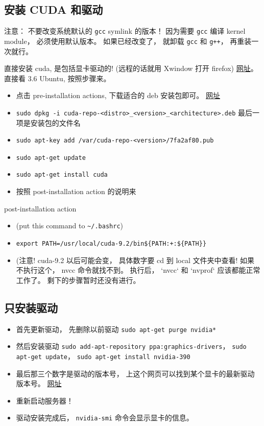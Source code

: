 

\subsection{安装 CUDA 和驱动}
注意： 不要改变系统默认的 \verb|gcc| symlink 的版本！ 因为需要 \verb|gcc| 编译 kernel module， 必须使用默认版本。 如果已经改变了， 就卸载 \verb|gcc| 和 \verb|g++|， 再重装一次就行。

直接安装 cuda, 是包括显卡驱动的! (远程的话就用 Xwindow 打开 firefox)
\href{https://docs.nvidia.com/cuda/cuda-installation-guide-linux/index.html#ubuntu-installation}{网址}。 直接看 3.6 Ubuntu, 按照步骤来。
\begin{itemize}
\item 点击 pre-installation actions, 下载适合的 deb 安装包即可。 \href{https://developer.nvidia.com/cuda-downloads}{网址}
\item \verb`sudo dpkg -i cuda-repo-<distro>_<version>_<architecture>.deb`   最后一项是安装包的文件名
\item \verb`sudo apt-key add /var/cuda-repo-<version>/7fa2af80.pub`
\item \verb`sudo apt-get update`
\item \verb`sudo apt-get install cuda`
\item 按照 post-installation action 的说明来
\end{itemize}

post-installation action
\begin{itemize}
\item (put this command to \verb|~/.bashrc|)
\item \verb`export PATH=/usr/local/cuda-9.2/bin${PATH:+:${PATH}}`
\item (注意! cuda-9.2 以后可能会变， 具体数字要 cd 到 local 文件夹中查看!
如果不执行这个， nvcc 命令就找不到。 执行后， `nvcc` 和 `nvprof` 应该都能正常工作了。
剩下的步骤暂时还没有进行。
\end{itemize}

\subsection{只安装驱动}
\begin{itemize}
\item 首先更新驱动， 先删除以前驱动 \verb|sudo apt-get purge nvidia*|
\item 然后安装驱动 \verb|sudo add-apt-repository ppa:graphics-drivers|， \verb|sudo apt-get update|， \verb|sudo apt-get install nvidia-390|
\item 最后那三个数字是驱动的版本号， 上这个网页可以找到某个显卡的最新驱动版本号。 \href{http://www.nvidia.com/Download/index.aspx?lang=en-us}{网址}
\item 重新启动服务器！
\item 驱动安装完成后， \verb|nvidia-smi| 命令会显示显卡的信息。
\end{itemize}
